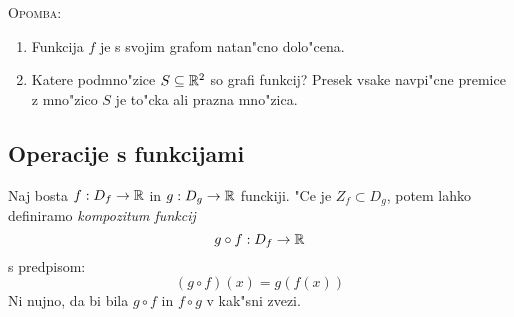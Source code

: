 \textsc{Opomba:}
\begin{enumerate}
	\item Funkcija $f$ je s svojim grafom natan"cno dolo"cena.
	\item Katere podmno"zice $S \subseteq \mathbb{R}^2$ so grafi funkcij? Presek vsake navpi"cne premice z mno"zico $S$ je to"cka ali prazna mno"zica.
\end{enumerate}
%
\subsection{Operacije s funkcijami}
 Naj bosta $f: D_f \to \mathbb{R}$ in $g: D_g \to \mathbb{R}$ funckiji. "Ce je $Z_f \subset D_g$, potem lahko definiramo \emph{kompozitum funkcij}
\begin{equation*}
g \circ f: D_f \to \mathbb{R}
\end{equation*}
s predpisom:
\begin{equation*}
(g \circ f)(x) = g(f(x))
\end{equation*}
Ni nujno, da bi bila $g\circ f$ in $f \circ g$ v kak"sni zvezi.

